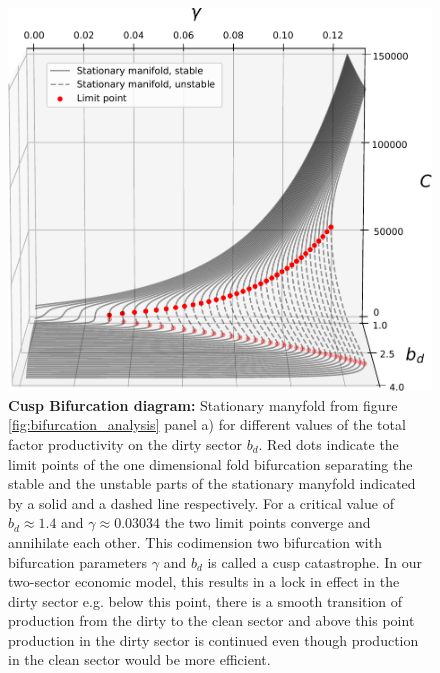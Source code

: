 \begin{figure}[ht!]
\centering\includegraphics[width=\linewidth]{figures/cusp_better.pdf}
\caption{\textbf{Cusp Bifurcation diagram:}
Stationary manyfold from figure \ref{fig:bifurcation_analysis} panel a) for different values of the total factor productivity on the dirty sector $b_d$. Red dots indicate the limit points of the one dimensional fold bifurcation separating the stable and the unstable parts of the stationary manyfold indicated by a solid and a dashed line respectively. For a critical value of $b_d \approx 1.4$ and $\gamma \approx 0.03034$ the two limit points converge and annihilate each other. This codimension two bifurcation with bifurcation parameters $\gamma$ and $b_d$ is called a cusp catastrophe. In our two-sector economic model, this results in a lock in effect in the dirty sector e.g. below this point, there is a smooth transition of production from the dirty to the clean sector and above this point production in the dirty sector is continued even though production in the clean sector would be more efficient. \label{fig:cusp}}
\end{figure}

